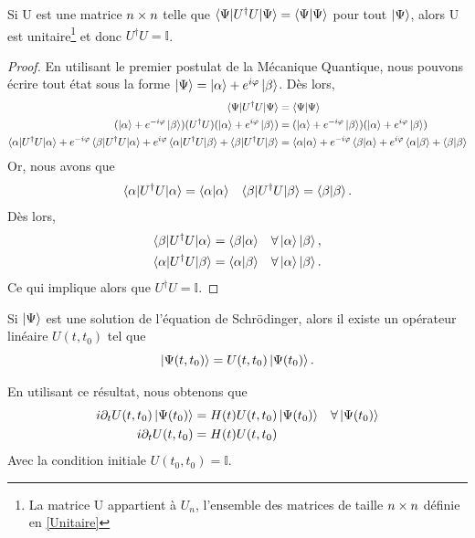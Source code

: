 \documentclass[../notesdecours.tex]{subfiles}
\begin{document}
\begin{theorem}
Si U est une matrice $n\times n$ telle que $\braket{\Psi|U^\dag U|\Psi} = \braket{\Psi|\Psi}$ pour tout $\ket{\Psi}$, alors U est unitaire\footnote{La matrice U appartient à $U_n$, l'ensemble des matrices de taille $n\times n$ définie en \ref{Unitaire}} et donc $U^\dag U = \mathbb{I}$.
\end{theorem}
\begin{proof}
En utilisant le premier postulat de la Mécanique Quantique, nous pouvons écrire tout état sous la forme $\ket{\Psi} = \ket{\alpha} + e^{i\varphi}\ket{\beta}$. Dès lors,
\begin{align*}
\braket{\Psi|U^\dag U|\Psi} &= \braket{\Psi|\Psi}\\
(\ket{\alpha} + e^{-i\varphi}\ket{\beta})(U^\dag U)(\ket{\alpha} + e^{i\varphi}\ket{\beta}) &= (\ket{\alpha} + e^{-i\varphi}\ket{\beta})(\ket{\alpha} + e^{i\varphi}\ket{\beta})\\
\braket{\alpha|U^\dag U|\alpha} + e^{-i\varphi}\braket{\beta|U^\dag U|\alpha} + e^{i\varphi}\braket{\alpha|U^\dag U|\beta} + \braket{\beta|U^\dag U|\beta} &= \braket{\alpha|\alpha} + e^{-i\varphi}\braket{\beta|\alpha} + e^{i\varphi}\braket{\alpha|\beta} + \braket{\beta|\beta}
\end{align*}
Or, nous avons que
\begin{align*}
\braket{\alpha|U^\dag U|\alpha} &= \braket{\alpha|\alpha}		&\braket{\beta|U^\dag U|\beta} = \braket{\beta|\beta}.
\end{align*}
Dès lors, 
\begin{align*}
\braket{\beta|U^\dag U |\alpha} &= \braket{\beta|\alpha}	&\forall\ket{\alpha}\ket{\beta},\\
\braket{\alpha|U^\dag U|\beta} &= \braket{\alpha|\beta}	&\forall\ket{\alpha}\ket{\beta}.
\end{align*}
Ce qui implique alors que $U^\dag U = \mathbb{I}$.
\end{proof}

\begin{Property} Si $\ket{\Psi}$ est une solution de l'équation de Schrödinger, alors il existe un opérateur linéaire $U(t,t_0)$ tel que
\begin{equation}
\ket{\Psi (t,t_0)} = U(t,t_0)\ket{\Psi(t_0)}.
\end{equation} \label{1}\end{Property}

En utilisant ce résultat, nous obtenons que
\begin{align*}
i\partial_t U(t,t_0)\ket{\Psi(t_0)} &= H(t)U(t,t_0)\ket{\Psi(t_0)}		&\forall\ket{\Psi(t_0)}\\
i\partial_t U(t,t_0) &= H(t)U(t,t_0)
\end{align*}
Avec la condition initiale $U(t_0,t_0) = \mathbb{I}$.\\
\end{document}
